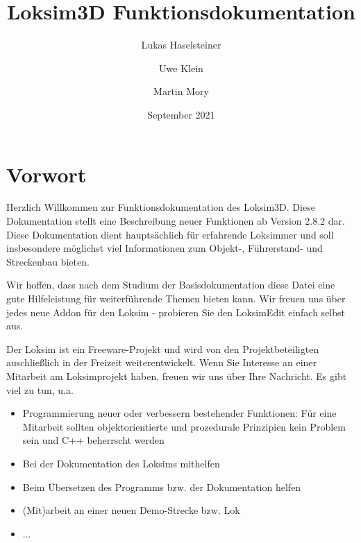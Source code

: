 \documentclass[11pt, a4paper]{refrep}
\begin{document}
\author{Lukas Haselsteiner \and Uwe Klein \and Martin Mory} 
\title{Loksim3D Funktionsdokumentation} 
\date{September 2021} 

\maketitle


\chapter{Vorwort}
Herzlich Willkommen zur Funktionsdokumentation des Loksim3D. Diese
Dokumentation stellt eine Beschreibung neuer Funktionen ab
Version 2.8.2 dar. Diese Dokumentation dient hauptsächlich für erfahrende Loksimmer 
und soll insbesondere möglichst viel Informationen zum
Objekt-, Führerstand- und Streckenbau bieten.

Wir hoffen, dass nach dem Studium der Basisdokumentation diese Datei
eine gute Hilfeleistung für weiterführende Themen bieten kann. Wir
freuen uns über jedes neue Addon für den Loksim - probieren Sie den
LoksimEdit einfach selbst aus.

Der Loksim ist ein Freeware-Projekt und wird von den Projektbeteiligten
auschließlich in der Freizeit weiterentwickelt. Wenn Sie Interesse an
einer Mitarbeit am Loksimprojekt haben, freuen wir uns über Ihre
Nachricht. Es gibt viel zu tun, u.a.

\begin{itemize}
\item
  Programmierung neuer oder verbessern bestehender Funktionen: 
  Für eine Mitarbeit sollten objektorientierte und prozedurale 
  Prinzipien kein Problem sein und C++ beherrscht werden
\item
  Bei der Dokumentation des Loksims mithelfen
\item
  Beim Übersetzen des Programms bzw. der Dokumentation helfen
\item 
  (Mit)arbeit an einer neuen Demo-Strecke bzw. Lok
\item ...
\end{itemize}

\clearpage

\tableofcontents 

\clearpage


\end{document}
